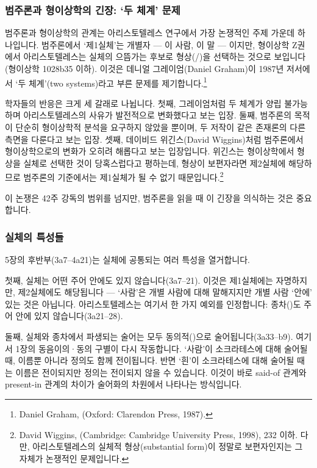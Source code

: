 \documentclass[12pt, a4paper]{article}
\begin{document}
\subsubsection{범주론과 형이상학의 긴장: `두 체계' 문제}

범주론과 형이상학의 관계는 아리스토텔레스 연구에서 가장 논쟁적인 주제 가운데 하나입니다. 범주론에서 `제1실체'는 개별자 --- 이 사람, 이 말 --- 이지만, 형이상학 Z권에서 아리스토텔레스는 실체의 으뜸가는 후보로 형상(/)을 선택하는 것으로 보입니다(형이상학 1028b35 이하). 이것은 데니얼 그레이엄(Daniel Graham)이 1987년 저서에서 `두 체계'(two systems)라고 부른 문제를 제기합니다.\footnote{Daniel Graham,  (Oxford: Clarendon Press, 1987).}

학자들의 반응은 크게 세 갈래로 나뉩니다. 첫째, 그레이엄처럼 두 체계가 양립 불가능하며 아리스토텔레스의 사유가 발전적으로 변화했다고 보는 입장. 둘째, 범주론의 목적이 단순히 형이상학적 분석을 요구하지 않았을 뿐이며, 두 저작이 같은 존재론의 다른 측면을 다룬다고 보는 입장. 셋째, 데이비드 위긴스(David Wiggins)처럼 범주론에서 형이상학으로의 변화가 오히려 해롭다고 보는 입장입니다. 위긴스는 형이상학에서 형상을 실체로 선택한 것이 당혹스럽다고 평하는데, 형상이 보편자라면 제2실체에 해당하므로 범주론의 기준에서는 제1실체가 될 수 없기 때문입니다.\footnote{David Wiggins,  (Cambridge: Cambridge University Press, 1998), 232 이하. 다만, 아리스토텔레스의 실체적 형상(substantial form)이 정말로 보편자인지는 그 자체가 논쟁적인 문제입니다.}

이 논쟁은 42주 강독의 범위를 넘지만, 범주론을 읽을 때 이 긴장을 의식하는 것은 중요합니다.

\subsubsection{실체의 특성들}

5장의 후반부(3a7--4a21)는 실체에 공통되는 여러 특성을 열거합니다.

첫째, 실체는 어떤 주어 안에도 있지 않습니다(3a7--21). 이것은 제1실체에는 자명하지만, 제2실체에도 해당됩니다 --- `사람'은 개별 사람에 대해 말해지지만 개별 사람 `안에' 있는 것은 아닙니다. 아리스토텔레스는 여기서 한 가지 예외를 인정합니다: 종차()도 주어 안에 있지 않습니다(3a21--28).

둘째, 실체와 종차에서 파생되는 술어는 모두 동의적()으로 술어됩니다(3a33--b9). 여기서 1장의 동음이의·동의 구별이 다시 작동합니다. `사람'이 소크라테스에 대해 술어될 때, 이름뿐 아니라 정의도 함께 전이됩니다. 반면 `흰'이 소크라테스에 대해 술어될 때는 이름은 전이되지만 정의는 전이되지 않을 수 있습니다. 이것이 바로 said-of 관계와 present-in 관계의 차이가 술어화의 차원에서 나타나는 방식입니다.
\end{document}
